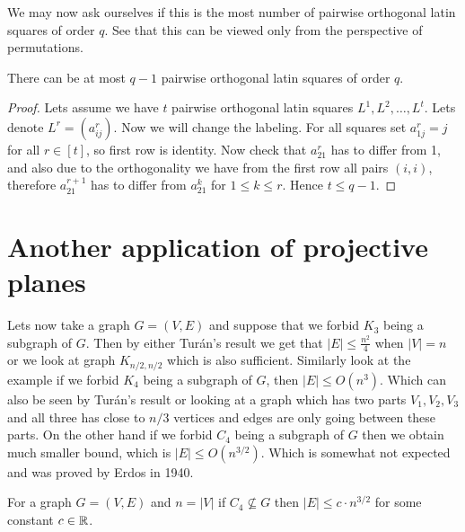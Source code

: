 We may now ask ourselves if this is the most number of pairwise orthogonal latin squares of order $q$. See that this can be viewed only from the perspective of permutations.

\begin{prop}
	There can be at most $q-1$ pairwise orthogonal latin squares of order $q$.
\end{prop}

\begin{proof}
	Lets assume we have $t$ pairwise orthogonal latin squares $L^1, L^2, \dots, L^t$. Lets denote $L^r = (a_{ij}^r)$. Now we will change the labeling. For all squares set $a_{1j}^r = j$  for all $r \in [t]$, so first row is identity. Now check that $a_{21}^r$ has to differ from 1, and also due to the orthogonality we have from the first row all pairs $(i,i)$, therefore $a_{21}^{r+1}$ has to differ from $a_{21}^{k}$ for $1 \leq k \leq r$. Hence $t \leq q-1$.
\end{proof}

\section{Another application of projective planes}

Lets now take a graph $G = (V,E)$ and suppose that we forbid $K_3$ being a subgraph of $G$. Then by either Turán's result we get that $|E| \leq \frac{n^2}{4}$ when $|V| = n$ or we look at graph $K_{n/2,n/2}$ which is also sufficient. Similarly look at the example if we forbid $K_4$ being a subgraph of $G$, then $|E| \leq O(n^3)$. Which can also be seen by Turán's result or looking at a graph which has two parts $V_1, V_2, V_3$ and all three has close to $n/3$ vertices and edges are only going between these parts. On the other hand if we forbid $C_4$ being a subgraph of $G$ then we obtain much smaller bound, which is $|E| \leq O(n^{3/2})$. Which is somewhat not expected and was proved by Erdos in 1940.

\begin{prop}
	For a graph $G = (V,E)$ and $n = |V|$ if $C_4 \not\subseteq G$ then $|E| \leq c \cdot n^{3/2}$ for some constant $c \in \mathbb{R}$.
\end{prop}

